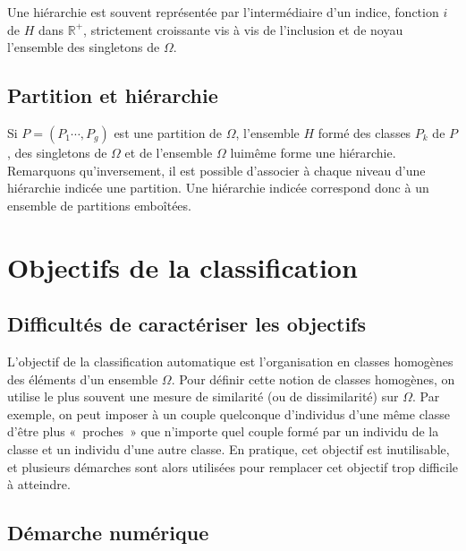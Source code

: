 \documentclass[letterpaper,10pt,french]{sphinxmanual}
\begin{document}
\sphinxAtStartPar
Une hiérarchie est souvent représentée par l’intermédiaire d’un indice, fonction \(i\) de \(H\) dans \(\mathbb{R}^+\), strictement croissante vis à vis de l’inclusion et de noyau l’ensemble des singletons de \(\Omega\).


\subsection{Partition et hiérarchie}
\label{\detokenize{clustering:partition-et-hierarchie}}
\sphinxAtStartPar
Si \(P =(P_1 \cdots,P_g)\) est une partition de \(\Omega\), l’ensemble \(H\) formé des classes \(P_k\) de \(P\), des singletons de   \(\Omega\) et de l’ensemble  \(\Omega\) lui\sphinxhyphen{}même forme une hiérarchie. Remarquons qu’inversement, il est possible d’associer à chaque niveau d’une hiérarchie indicée une partition. Une hiérarchie indicée correspond donc à un ensemble de partitions emboîtées.


\section{Objectifs de la classification}
\label{\detokenize{clustering:objectifs-de-la-classification}}

\subsection{Difficultés de caractériser les objectifs}
\label{\detokenize{clustering:difficultes-de-caracteriser-les-objectifs}}
\sphinxAtStartPar
L’objectif de la classification automatique est l’organisation en classes homogènes des éléments d’un ensemble  \(\Omega\). Pour définir cette notion de classes homogènes, on utilise le plus souvent une mesure de similarité (ou de dissimilarité) sur  \(\Omega\). Par exemple, on peut imposer à un couple quelconque d’individus d’une même classe d’être plus « proches » que n’importe quel couple formé par un individu de la classe et un individu d’une autre classe. En pratique, cet objectif est inutilisable, et plusieurs démarches sont alors utilisées pour remplacer cet objectif trop difficile à atteindre.


\subsection{Démarche numérique}
\label{\detokenize{clustering:demarche-numerique}}
\end{document}
